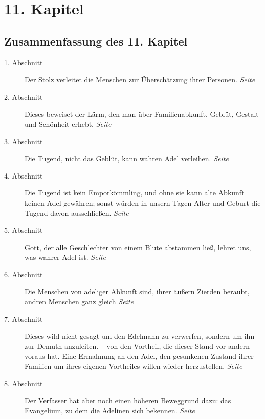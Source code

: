 
\chapter{11. Kapitel} \label{kap11}
\section{Zusammenfassung des 11. Kapitel}

\begin{description}
\item[1. Abschnitt] Der Stolz verleitet die Menschen zur Überschätzung ihrer
Personen.
\dotfill \textit{Seite \pageref{kap11_ab1}}\\
\item[2. Abschnitt] Dieses beweiset der Lärm, den man über Familienabkunft,
Geblüt, Gestalt und Schönheit erhebt.
\dotfill \textit{Seite \pageref{kap11_ab2}}\\
\item[3. Abschnitt] Die Tugend, nicht das Geblüt, kann wahren Adel verleihen.
\dotfill \textit{Seite \pageref{kap11_ab3}}\\
\item[4. Abschnitt] Die Tugend ist kein Emporkömmling, und ohne sie kann alte
Abkunft keinen Adel gewähren; sonst würden in unsern Tagen Alter und Geburt die
Tugend davon ausschließen.
\dotfill \textit{Seite \pageref{kap11_ab4}}\\
\item[5. Abschnitt] Gott, der alle Geschlechter von einem Blute abstammen ließ,
lehret uns, was wahrer Adel ist.
\dotfill \textit{Seite \pageref{kap11_ab5}}\\
\item[6. Abschnitt] Die Menschen von adeliger Abkunft sind, ihrer äußern Zierden
beraubt, andren Menschen ganz gleich
\dotfill \textit{Seite \pageref{kap11_ab6}}\\
\item[7. Abschnitt] Dieses wild nicht gesagt um den Edelmann zu verwerfen,
sondern um ihn zur Demuth anzuleiten. -- von den Vortheil, die dieser Stand vor
andern voraus hat. Eine Ermahnung an den Adel, den gesunkenen Zustand ihrer
Familien um ihres eigenen Vortheiles willen wieder herzustellen.
\dotfill \textit{Seite \pageref{kap11_ab7}}\\
\item[8. Abschnitt] Der Verfasser hat aber noch einen höheren Beweggrund dazu:
das Evangelium, zu dem die Adelinen sich bekennen.
\dotfill \textit{Seite \pageref{kap11_ab8}}\\

\end{description}
